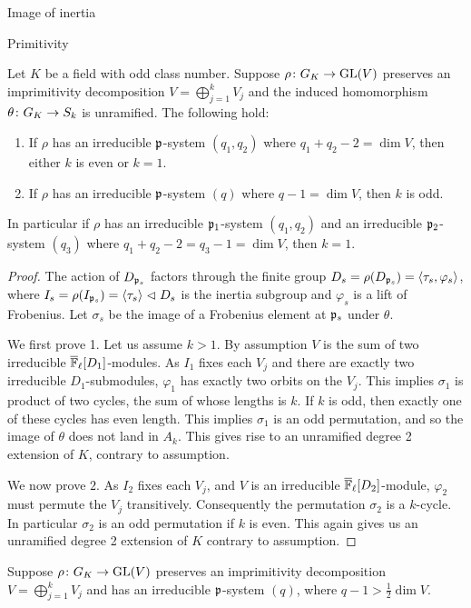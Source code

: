 \documentclass[11pt,a4paper]{article}
\begin{document}
\begin{section}{Image of inertia}
\begin{subsection}{Primitivity}
\begin{proposition}
\label{prop_primitivity_odd_class_number}
Let $K$ be a field with odd class number.
Suppose $\rho\colon \GK \rightarrow \GL(V)$ preserves an imprimitivity decomposition $V=\bigoplus^{k}_{j=1}V_j$ and the induced homomorphism $\theta\colon G_{K} \rightarrow S_k$ is unramified.
The following hold:
\begin{enumerate}
    \item If $\rho$ has an irreducible $\mathfrak{p}$-system $(q_1,q_2)$ where $q_1+q_2-2 = \dim V$, then either $k$ is even or $k=1$.
    \item If $\rho$ has an irreducible $\mathfrak{p}$-system $(q)$ where $q-1 = \dim V$, then $k$ is odd.
\end{enumerate}
In particular if $\rho$  has an irreducible $\mathfrak{p}_1$-system $(q_1,q_2)$ and an irreducible $\mathfrak{p}_2$-system $(q_3)$ where $q_1+q_2- 2 = q_3-1= \dim V$, then $k=1$.
\end{proposition}%

\begin{proof}
The action of $D_{\mathfrak{p}_s}$ factors through the finite group $D_s = \rho(D_{\mathfrak{p}_s}) = \langle \tau_s , \varphi_s \rangle$, where $I_s = \rho(I_{\mathfrak{p}_s}) = \langle \tau_s \rangle \vartriangleleft D_s$ is the inertia subgroup and $\varphi_s$ is a lift of Frobenius.
Let $\sigma_s$ be the image of a Frobenius element at $\mathfrak{p}_s$ under $\theta$.


We first prove 1. Let us assume $k>1$.
By assumption $V$ is the sum of two irreducible ${\overline{\mathbb{F}}_\ell}[D_{1}]$-modules. As $I_1$ fixes each $V_j$ and there are exactly two irreducible $D_1$-submodules, $\varphi_1$ has exactly two orbits on the $V_j$. This implies $\sigma_1$ is product of two cycles, the sum of whose lengths is $k$.
If $k$ is odd, then exactly one of these cycles has even length. This implies $\sigma_1$ is an odd permutation, and so the image of $\theta$ does not land in $A_k$. This gives rise to an unramified degree 2 extension of $K$, contrary to assumption.

We now prove $2$.
 As $I_2$ fixes each $V_j$, and $V$ is an irreducible ${\overline{\mathbb{F}}_\ell}[D_{2}]$-module, $\varphi_2$ must permute the $V_j$ transitively.
Consequently the permutation $\sigma_2$ is a $k$-cycle. 
In particular $\sigma_2$ is an odd permutation if $k$ is even.
This again gives us an unramified degree 2 extension of $K$ contrary to assumption.
\end{proof}

\begin{lemma}
\label{lemma_primitivity_unramified_case}
Suppose $\rho\colon \GK \rightarrow \GL(V)$ preserves an imprimitivity decomposition $V=\bigoplus^{k}_{j=1}V_j$ and has an irreducible $\mathfrak{p}$-system $(q)$, where $q-1> \frac{1}{2}\dim V$.


\end{lemma}
\end{subsection}
\end{section}
\end{document}
